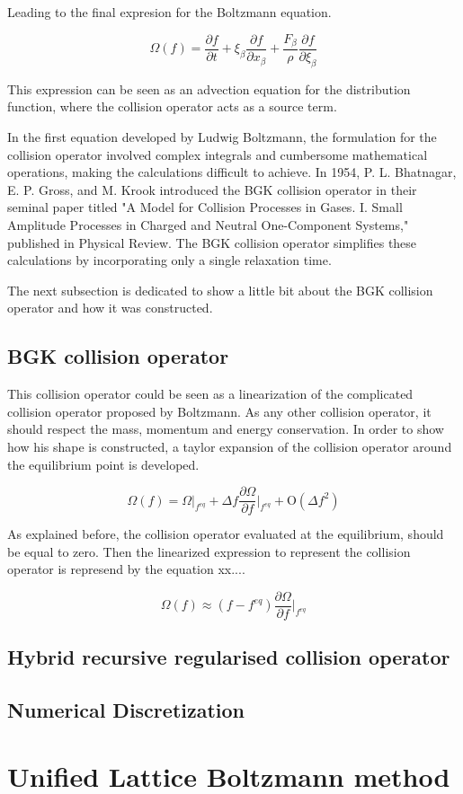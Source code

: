 Leading to the final expresion for the Boltzmann equation.

\begin{equation}
	\Omega(f) = \frac{\partial f}{\partial t} 
	+ \xi_{\beta}\frac{\partial f}{\partial x_{\beta}}
	+ \frac{F_{\beta}}{\rho}\frac{\partial f}{\partial \xi_{\beta}}
\end{equation}

This expression can be seen as an advection equation for the distribution 
function, where the collision operator acts as a source term.

In the first equation developed by Ludwig Boltzmann, the formulation for
the collision operator involved complex integrals and cumbersome mathematical 
operations, making the calculations difficult to achieve. In 1954, 
P. L. Bhatnagar, E. P. Gross, and M. Krook introduced the BGK collision 
operator in their seminal paper titled "A Model for Collision Processes 
in Gases. I. Small Amplitude Processes in Charged and Neutral One-Component 
Systems," published in Physical Review. The BGK collision operator 
simplifies these calculations by incorporating only a single relaxation time.

The next subsection is dedicated to show a little bit about the BGK collision 
operator and how it was constructed.

\subsection{BGK collision operator}
This collision operator could be seen as a linearization of the complicated 
collision operator proposed by Boltzmann. As any other collision operator,
it should respect the mass, momentum and energy conservation. In order to show
how his shape is constructed, a taylor expansion of the collision operator
around the equilibrium point is developed.

\begin{equation}
	\Omega(f) = \Omega|_{f^{eq}} 
	+ \Delta f \frac{\partial \Omega}{\partial f} \bigg|_{f^{eq}} 
	+ \mathrm{O}(\Delta f^2)
\end{equation}

As explained before, the collision operator evaluated at the equilibrium, should 
be equal to zero. Then the linearized expression to represent the collision
operator is represend by the equation xx....

\begin{equation}
	\Omega(f) \approx 
	(f-f^{eq}) \frac{\partial \Omega}{\partial f} \bigg|_{f^{eq}} 
\end{equation}

\subsection{Hybrid recursive regularised collision operator}

\subsection{Numerical Discretization}

\section{Unified Lattice Boltzmann method}